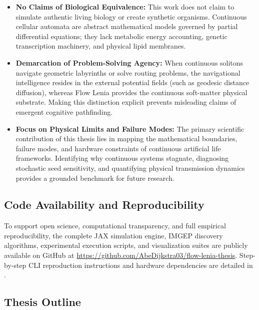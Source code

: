 \begin{itemize}
    \item \textbf{No Claims of Biological Equivalence:} This work does not claim to simulate authentic living biology or create synthetic organisms. Continuous cellular automata are abstract mathematical models governed by partial differential equations; they lack metabolic energy accounting, genetic transcription machinery, and physical lipid membranes.
    \item \textbf{Demarcation of Problem-Solving Agency:} When continuous solitons navigate geometric labyrinths or solve routing problems, the navigational intelligence resides in the external potential fields (such as geodesic distance diffusion), whereas Flow Lenia provides the continuous soft-matter physical substrate. Making this distinction explicit prevents misleading claims of emergent cognitive pathfinding.
    \item \textbf{Focus on Physical Limits and Failure Modes:} The primary scientific contribution of this thesis lies in mapping the mathematical boundaries, failure modes, and hardware constraints of continuous artificial life frameworks. Identifying why continuous systems stagnate, diagnosing stochastic seed sensitivity, and quantifying physical transmission dynamics provides a grounded benchmark for future research.
\end{itemize}

\subsection{Code Availability and Reproducibility}
\label{subsec:intro_code_reproducibility}

To support open science, computational transparency, and full empirical reproducibility, the complete JAX simulation engine, IMGEP discovery algorithms, experimental execution scripts, and visualization suites are publicly available on GitHub at \url{https://github.com/AbeDijkstra03/flow-lenia-thesis}. Step-by-step CLI reproduction instructions and hardware dependencies are detailed in .

\subsection{Thesis Outline}
\label{subsec:intro_outline}

